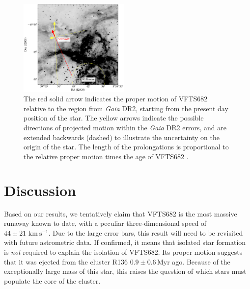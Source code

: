 \documentclass[apjl,twocolumn]{emulateapj}
\newcommand{\todo}[1]{{\large $\blacksquare$~\textbf{\color{red}[#1]}}~$\blacksquare$}
\newcommand{\SdM}[1]{{{\color{brown}{#1}}}}
\newcommand{\kms}{{\,\mathrm{km\ s^{-1}}}}
\begin{document}
\begin{figure}%
  \centering
  \includegraphics[width=0.48\textwidth]{./figures/main_plot_good_gaia_only}  
  \caption{\SdM{I don't see a reason why we would not show the HST data, except for wanting to hide it maybe.  Let's sit together and find a good way to plot both.  (Hope you still have the script to show the HST direction. )}  The red solid arrow indicates the proper motion of VFTS682 
    relative to the region from \emph{Gaia} DR2, starting from the present day position of
    the star. The yellow arrows indicate the possible
    directions of projected motion within the \emph{Gaia} DR2 errors, and are extended
    backwards (dashed) to illustrate the uncertainty on the origin of the
    star. The length of the prolongations is proportional to the relative proper motion
    times the age of VFTS682 \citep[$1.0\pm0.2$\,Myr,][]{schneider:18}.
  }
  
  \label{fig:main}
\end{figure}


\section{Discussion}
\label{sec:discussion}

Based on our results, we tentatively claim that VFTS682 is the most massive
runaway known to date, with a peculiar three-dimensional speed of
$44\pm21\,\kms$. Due to the large error bars, this result will need
to be revisited with future astrometric data. %
If confirmed, it means that isolated star formation is
\emph{not} required to explain the isolation of VFTS682. Its proper motion suggests that it was ejected from the cluster R136
$0.9\pm0.6$\,Myr ago. Because of the exceptionally large mass
of this star, this raises the question of which stars must populate
the core of the cluster.
\end{document}
